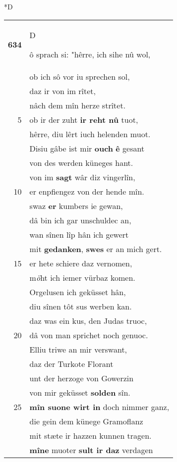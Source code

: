 \documentclass[8pt,a4paper,notitlepage]{article}
\begin{document}
\begin{table}[ht]
\begin{minipage}[t]{0.5\linewidth}
\small
\begin{center}*D
\end{center}
\begin{tabular}{rl}
\textbf{634} & \begin{large}D\end{large}ô sprach si: "hêrre, ich sihe nû wol,\\ 
 & ob ich sô vor iu sprechen sol,\\ 
 & daz ir von im rîtet,\\ 
 & nâch dem mîn herze strîtet.\\ 
5 & ob ir der zuht \textbf{ir reht nû} tuot,\\ 
 & hêrre, diu lêrt iuch helenden muot.\\ 
 & Disiu gâbe ist mir \textbf{ouch} \textbf{ê} gesant\\ 
 & von des werden küneges hant.\\ 
 & von im \textbf{sagt} wâr diz vingerlîn,\\ 
10 & er enpfiengez von der hende mîn.\\ 
 & swaz \textbf{er} kumbers ie gewan,\\ 
 & dâ bin ich gar unschuldec an,\\ 
 & wan sînen lîp hân ich gewert\\ 
 & mit \textbf{gedanken}, \textbf{swes} er an mich gert.\\ 
15 & er hete schiere daz vernomen,\\ 
 & m\textit{ö}ht ich iemer vürbaz komen.\\ 
 & Orgelusen ich geküsset hân,\\ 
 & diu sînen tôt sus werben kan.\\ 
 & daz was ein kus, den Judas truoc,\\ 
20 & dâ von man sprichet noch genuoc.\\ 
 & Elliu triwe an mir verswant,\\ 
 & daz der Turkote Florant\\ 
 & unt der herzoge von Gowerzin\\ 
 & von mir geküsset \textbf{solden} sîn.\\ 
25 & \textbf{mîn suone wirt in} doch nimmer ganz,\\ 
 & die gein dem künege Gramoflanz\\ 
 & mit stæte ir hazzen kunnen tragen.\\ 
 & \textbf{mîne} muoter \textbf{sult ir daz} verdagen\\ 

\end{tabular}
\end{minipage}
\end{table}
\end{document}
